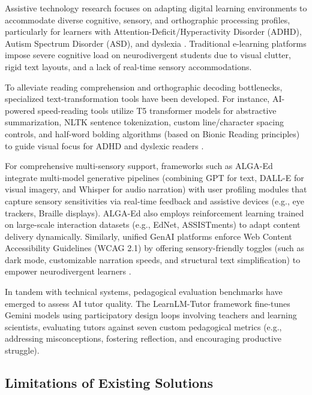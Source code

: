 Assistive technology research focuses on adapting digital learning environments to accommodate diverse cognitive, sensory, and orthographic processing profiles, particularly for learners with Attention-Deficit/Hyperactivity Disorder (ADHD), Autism Spectrum Disorder (ASD), and dyslexia \cite{rocha2025aigen}. Traditional e-learning platforms impose severe cognitive load on neurodivergent students due to visual clutter, rigid text layouts, and a lack of real-time sensory accommodations.

To alleviate reading comprehension and orthographic decoding bottlenecks, specialized text-transformation tools have been developed. For instance, AI-powered speed-reading tools utilize T5 transformer models for abstractive summarization, NLTK sentence tokenization, custom line/character spacing controls, and half-word bolding algorithms (based on Bionic Reading principles) to guide visual focus for ADHD and dyslexic readers \cite{yusri2024speed}. 

For comprehensive multi-sensory support, frameworks such as ALGA-Ed \cite{farhah2025enhancing} integrate multi-model generative pipelines (combining GPT for text, DALL-E for visual imagery, and Whisper for audio narration) with user profiling modules that capture sensory sensitivities via real-time feedback and assistive devices (e.g., eye trackers, Braille displays). ALGA-Ed also employs reinforcement learning trained on large-scale interaction datasets (e.g., EdNet, ASSISTments) to adapt content delivery dynamically. Similarly, unified GenAI platforms enforce Web Content Accessibility Guidelines (WCAG 2.1) by offering sensory-friendly toggles (such as dark mode, customizable narration speeds, and structural text simplification) to empower neurodivergent learners \cite{rocha2025aigen}.

In tandem with technical systems, pedagogical evaluation benchmarks have emerged to assess AI tutor quality. The LearnLM-Tutor framework \cite{jurenka2025towards} fine-tunes Gemini models using participatory design loops involving teachers and learning scientists, evaluating tutors against seven custom pedagogical metrics (e.g., addressing misconceptions, fostering reflection, and encouraging productive struggle).

\subsection{Limitations of Existing Solutions}
\label{subsec:limitations_existing}

